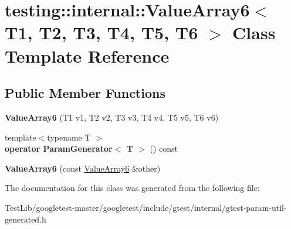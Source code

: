\hypertarget{classtesting_1_1internal_1_1ValueArray6}{}\section{testing\+:\+:internal\+:\+:Value\+Array6$<$ T1, T2, T3, T4, T5, T6 $>$ Class Template Reference}
\label{classtesting_1_1internal_1_1ValueArray6}
\subsection*{Public Member Functions}
\begin{DoxyCompactItemize}
\item 
\mbox{\label{classtesting_1_1internal_1_1ValueArray6_ad1c323929591d89807220281ceb6d4d5}} 
{\bfseries Value\+Array6} (T1 v1, T2 v2, T3 v3, T4 v4, T5 v5, T6 v6)
\item 
\mbox{\label{classtesting_1_1internal_1_1ValueArray6_ab6cb557146bca7cf5fcfa40f10dee9da}} 
{\footnotesize template$<$typename T $>$ }\\{\bfseries operator Param\+Generator$<$ T $>$} () const
\item 
\mbox{\label{classtesting_1_1internal_1_1ValueArray6_a270702109b4185c6749310902fed7456}} 
{\bfseries Value\+Array6} (const \hyperlink{classtesting_1_1internal_1_1ValueArray6}{Value\+Array6} \&other)
\end{DoxyCompactItemize}


The documentation for this class was generated from the following file\+:\begin{DoxyCompactItemize}
\item 
Test\+Lib/googletest-\/master/googletest/include/gtest/internal/gtest-\/param-\/util-\/generated.\+h\end{DoxyCompactItemize}
